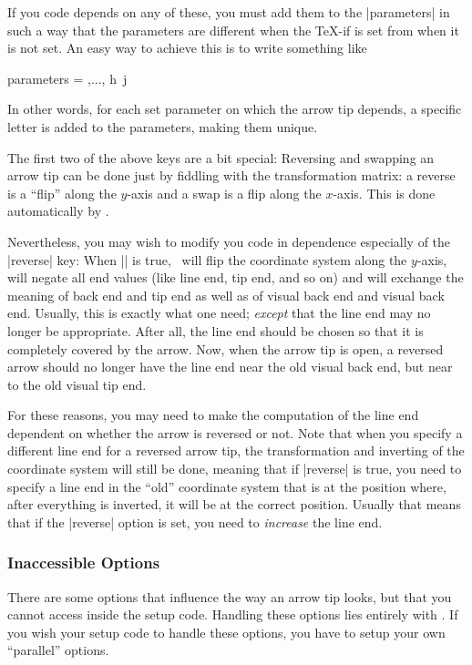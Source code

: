 If you code depends on any of these, you must add them to
the |parameters| in such a way that the parameters are different when
the \TeX-if is set from when it is not set. An easy way to achieve
this is to write something like
\begin{codeexample}
  parameters = { \the\pgfarrowlength,...,
                 \ifpgfarrowharpoon h\fi\
                 \ifpgfarrowroundjoin j\fi}  
\end{codeexample}
In other words, for each set parameter on which the arrow tip depends,
a specific letter is added to the parameters, making them unique.

The first two of the above keys are a bit special: Reversing and swapping an
arrow tip can be done just by fiddling with the
transformation matrix: a reverse is a ``flip'' along the $y$-axis and
a swap is a flip along the $x$-axis. This is done automatically by
\pgfname.

Nevertheless, you may wish to modify you code in dependence
especially of the |reverse| key: When |\ifpgfarrowreverse| is true,
\pgfname\ will flip the coordinate system along the $y$-axis, will
negate all end values (like line end, tip end, and so on) and will
exchange the meaning of back end and tip end as well as of visual back
end and visual back end. Usually, this is exactly what one need;
\emph{except} that the line end may no longer be appropriate. After
all, the line end should be chosen so that it is completely covered by
the arrow. Now, when the arrow tip is open, a reversed arrow should no
longer have the line end near the old visual back end, but near to the
old visual tip end.

For these reasons, you may need to make the computation of the line
end dependent on whether the arrow is reversed or not. Note that when
you specify a different line end for a reversed arrow tip, the
transformation and inverting of the coordinate system will still be
done, meaning that if |reverse| is true, you need to specify a line
end in the ``old'' coordinate system that is at the position where,
after everything is inverted, it will be at the correct
position. Usually that means that if the |reverse| option is set, you
need to \emph{increase} the line end.


\subsubsection{Inaccessible Options}

There are some options that influence the way an arrow tip looks, but
that you cannot access inside the setup code. Handling these options
lies entirely with \pgfname. If you wish your setup code to handle
these options, you have to setup your own ``parallel'' options.

